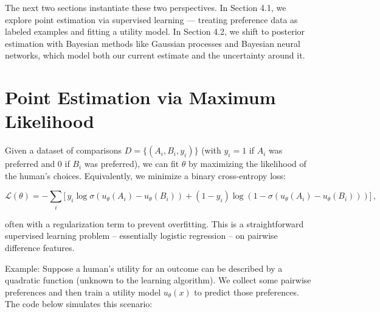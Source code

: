 \documentclass[
  letterpaper,
  numbers=noenddot,
  DIV=11]{scrreprt}
\theoremstyle{plain}
\theoremstyle{definition}
\theoremstyle{remark}
\begin{document}
The next two sections instantiate these two perspectives. In Section
4.1, we explore point estimation via supervised learning --- treating
preference data as labeled examples and fitting a utility model. In
Section 4.2, we shift to posterior estimation with Bayesian methods like
Gaussian processes and Bayesian neural networks, which model both our
current estimate and the uncertainty around it.

\section{Point Estimation via Maximum
Likelihood}\label{point-estimation-via-maximum-likelihood}

Given a dataset of comparisons \(D=\{(A_i, B_i, y_i)\}\) (with \(y_i=1\)
if \(A_i\) was preferred and \(0\) if \(B_i\) was preferred), we can fit
\(\theta\) by maximizing the likelihood of the human's choices.
Equivalently, we minimize a binary cross-entropy loss:

\[
\mathcal{L}(\theta) = -\sum_{i} \Big[\,y_i \log \sigma(u_\theta(A_i)\!-\!u_\theta(B_i)) + (1-y_i)\log(1-\sigma(u_\theta(A_i)\!-\!u_\theta(B_i)))\Big]\,,
\]

often with a regularization term to prevent overfitting. This is a
straightforward supervised learning problem -- essentially logistic
regression -- on pairwise difference features.

Example: Suppose a human's utility for an outcome can be described by a
quadratic function (unknown to the learning algorithm). We collect some
pairwise preferences and then train a utility model \(u_\theta(x)\) to
predict those preferences. The code below simulates this scenario:
\end{document}
